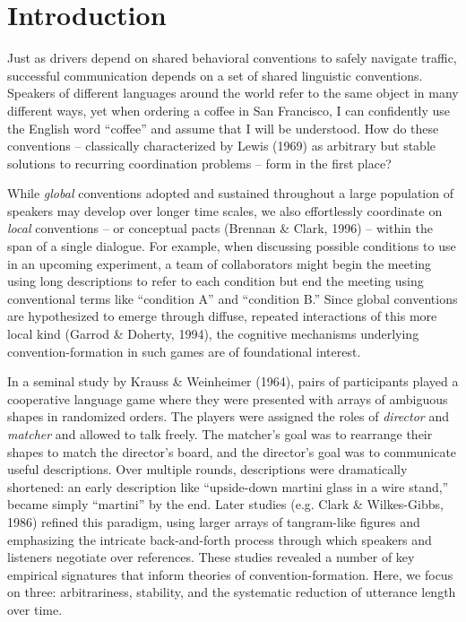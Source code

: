 \documentclass[alpha-refs]{wiley-article}
\begin{document}
\section{Introduction}\label{introduction}

Just as drivers depend on shared behavioral conventions to safely
navigate traffic, successful communication depends on a set of shared
linguistic conventions. Speakers of different languages around the world
refer to the same object in many different ways, yet when ordering a
coffee in San Francisco, I can confidently use the English word
``coffee'' and assume that I will be understood. How do these
conventions -- classically characterized by Lewis (1969) as arbitrary
but stable solutions to recurring coordination problems -- form in the
first place?

While \emph{global} conventions adopted and sustained throughout a large
population of speakers may develop over longer time scales, we also
effortlessly coordinate on \emph{local} conventions -- or conceptual
pacts (Brennan \& Clark, 1996) -- within the span of a single dialogue.
For example, when discussing possible conditions to use in an upcoming
experiment, a team of collaborators might begin the meeting using long
descriptions to refer to each condition but end the meeting using
conventional terms like ``condition A'' and ``condition B.'' Since
global conventions are hypothesized to emerge through diffuse, repeated
interactions of this more local kind (Garrod \& Doherty, 1994), the
cognitive mechanisms underlying convention-formation in such games are
of foundational interest.

In a seminal study by Krauss \& Weinheimer (1964), pairs of participants
played a cooperative language game where they were presented with arrays
of ambiguous shapes in randomized orders. The players were assigned the
roles of \emph{director} and \emph{matcher} and allowed to talk freely.
The matcher's goal was to rearrange their shapes to match the director's
board, and the director's goal was to communicate useful descriptions.
Over multiple rounds, descriptions were dramatically shortened: an early
description like ``upside-down martini glass in a wire stand,'' became
simply ``martini'' by the end. Later studies (e.g. Clark \&
Wilkes-Gibbs, 1986) refined this paradigm, using larger arrays of
tangram-like figures and emphasizing the intricate back-and-forth
process through which speakers and listeners negotiate over references.
These studies revealed a number of key empirical signatures that inform
theories of convention-formation. Here, we focus on three:
arbitrariness, stability, and the systematic reduction of utterance
length over time.
\end{document}
